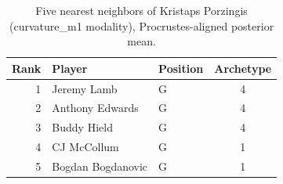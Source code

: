 \begin{table}[htbp]
  \centering\small
  \begin{tabular}{rllc}
    \toprule
    Rank & Player & Position & Archetype \\
    \midrule
    1 & Jeremy Lamb & G & 4 \\
    2 & Anthony Edwards & G & 4 \\
    3 & Buddy Hield & G & 4 \\
    4 & CJ McCollum & G & 1 \\
    5 & Bogdan Bogdanovic & G & 1 \\
    \bottomrule
  \end{tabular}
  \caption{Five nearest neighbors of Kristaps Porzingis (curvature_m1 modality), Procrustes-aligned posterior mean.}
  \label{tab:Kristaps_Porzingis_neighbors_curvature_m1}
\end{table}

